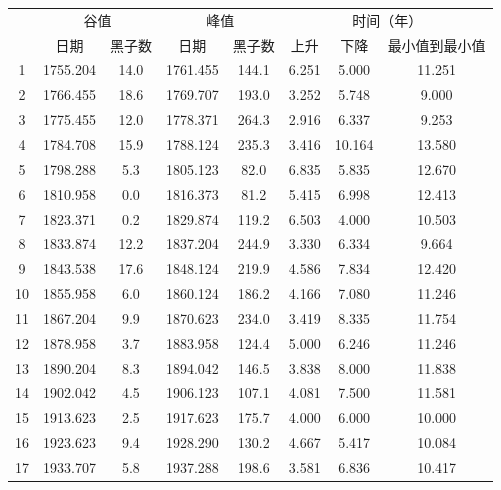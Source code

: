 \begin{table}[!htbp]
  \centering
  \label{tab:ss_max_min}
  \footnotesize
  \begin{tabular}{cccccccc}
    \toprule
    \multicolumn{1}{c}{}&\multicolumn{2}{c}{谷值}&
    \multicolumn{2}{c}{峰值}& \multicolumn{3}{c}{时间（年）}\\
    \cmidrule(lr){2-3} \cmidrule(lr){4-5} \cmidrule(lr){6-8} \noalign{\smallskip}
    \multicolumn{1}{c}{太阳周} & 日期 & 黑子数 & 日期 & 黑子数 & 上升 & 下降 & 最小值到最小值\\ 
    \midrule 
    1 & 1755.204 & 14.0 & 1761.455 & 144.1 & 6.251 & 5.000 & 11.251 \\
    2 & 1766.455 & 18.6 & 1769.707 & 193.0 & 3.252 & 5.748 & 9.000 \\
    3 & 1775.455 & 12.0 & 1778.371 & 264.3 & 2.916 & 6.337 & 9.253 \\
    4 & 1784.708 & 15.9 & 1788.124 & 235.3 & 3.416 & 10.164 & 13.580 \\
    5 & 1798.288 & 5.3 & 1805.123 & 82.0 & 6.835 & 5.835 & 12.670 \\
    6 & 1810.958 & 0.0 & 1816.373 & 81.2 & 5.415 & 6.998 & 12.413 \\
    7 & 1823.371 & 0.2 & 1829.874 & 119.2 & 6.503 & 4.000 & 10.503 \\
    8 & 1833.874 & 12.2 & 1837.204 & 244.9 & 3.330 & 6.334 & 9.664 \\
    9 & 1843.538 & 17.6 & 1848.124 & 219.9 & 4.586 & 7.834 & 12.420 \\
    10 & 1855.958 & 6.0 & 1860.124 & 186.2 & 4.166 & 7.080 & 11.246 \\
    11 & 1867.204 & 9.9 & 1870.623 & 234.0 & 3.419 & 8.335 & 11.754 \\
    12 & 1878.958 & 3.7 & 1883.958 & 124.4 & 5.000 & 6.246 & 11.246 \\
    13 & 1890.204 & 8.3 & 1894.042 & 146.5 & 3.838 & 8.000 & 11.838 \\
    14 & 1902.042 & 4.5 & 1906.123 & 107.1 & 4.081 & 7.500 & 11.581 \\
    15 & 1913.623 & 2.5 & 1917.623 & 175.7 & 4.000 & 6.000 & 10.000 \\
    16 & 1923.623 & 9.4 & 1928.290 & 130.2 & 4.667 & 5.417 & 10.084 \\
    17 & 1933.707 & 5.8 & 1937.288 & 198.6 & 3.581 & 6.836 & 10.417 \\

\end{tabular}
\end{table}
